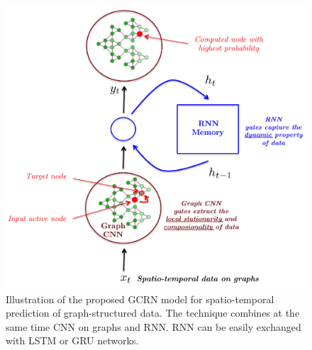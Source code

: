 \documentclass{article} %
\begin{document}
\begin{figure}[t]
	\begin{minipage}[t]{0.59\linewidth}
		\includegraphics[width=\linewidth]{gcnn_rnn}
		\caption{Illustration of the proposed GCRN model for spatio-temporal prediction of graph-structured data. The technique combines at the same time CNN on graphs and RNN. RNN can be easily exchanged with LSTM or GRU networks.}
		\label{fig:gcrn}
	\end{minipage} \hfill
	\begin{minipage}[t]{0.37\linewidth}

\end{minipage}
\end{figure}
\end{document}
